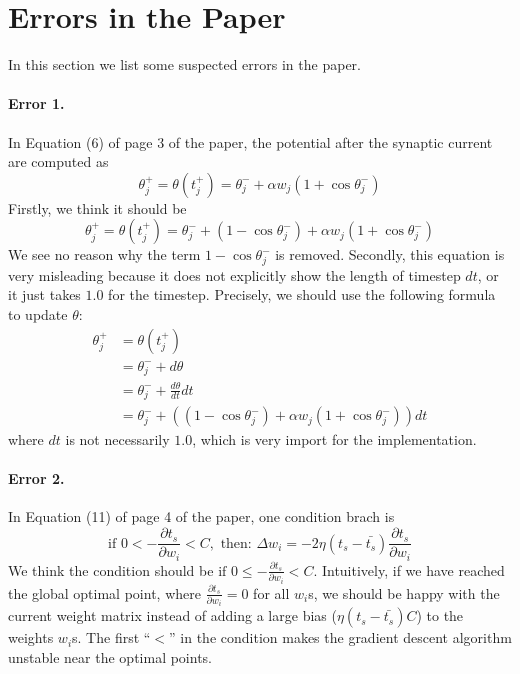 \section{Errors in the Paper}
\label{error}

In this section we list some suspected errors in the paper.

\paragraph{Error 1.}
In Equation (6) of page 3 of the paper, the potential after the synaptic current are computed as
\begin{equation}
	\theta_j^+ = \theta(t_j^+) = \theta_j^- + \alpha w_j (1+\cos \theta_j^-)
\end{equation}
Firstly, we think it should be 
\begin{equation}
	\theta_j^+ = \theta(t_j^+) = \theta_j^- + (1-\cos \theta_j^-) + \alpha w_j (1+\cos \theta_j^-)
\end{equation}
We see no reason why the term $ 1-\cos \theta_j^-$ is removed.
Secondly, this equation is very misleading because it does not explicitly show the length of timestep $dt$,
or it just takes $1.0$ for the timestep.
Precisely, we should use the following formula to update $\theta$:
\begin{align}
	\theta_j^+ &= \theta(t_j^+) \\
	&= \theta_j^- + d\theta \\
	&= \theta_j^- + \frac{d\theta}{dt} dt\\
	&= \theta_j^- + ((1-\cos \theta_j^-) + \alpha w_j (1+\cos \theta_j^-))dt
\end{align}
where $dt$ is not necessarily $1.0$, which is very import for the implementation.


\paragraph{Error 2.} 
In Equation (11) of page 4 of the paper, one condition brach is
\begin{equation}
	\textrm{if } 0 < -\frac{\partial t_s}{\partial w_i} < C,
	\textrm{ then: } \Delta w_i = -2\eta(t_s - \bar{t_s}) \frac{\partial t_s}{\partial w_i}
\end{equation}
We think the condition should be $\textrm{if } 0 \leq -\frac{\partial t_s}{\partial w_i} < C$.
Intuitively, if we have reached the global optimal point, where $\frac{\partial t_s}{\partial w_i} = 0$ for all $w_i$s,
we should be happy with the current weight matrix
instead of adding a large bias ($\eta(t_s - \bar{t_s}) C$) to the weights $w_i$s.
The first ``$<$'' in the condition makes the gradient descent algorithm unstable near the optimal points.

